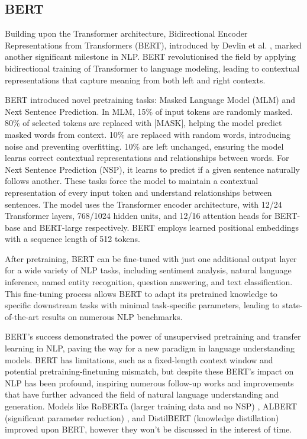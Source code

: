 \documentclass[a4paper, oneside]{discothesis}
\begin{document}
\subsection{BERT}
Building upon the Transformer architecture, Bidirectional Encoder Representations from Transformers (BERT), introduced by Devlin et al. \cite{devlin2018bert}, marked another significant milestone in NLP. BERT revolutionised the field by applying bidirectional training of Transformer to language modeling, leading to contextual representations that capture meaning from both left and right contexts.

BERT introduced novel pretraining tasks: Masked Language Model (MLM) and Next Sentence Prediction. In MLM, 15\% of input tokens are randomly masked. 80\% of selected tokens are replaced with [MASK], helping the model predict masked words from context. 10\% are replaced with random words, introducing noise and preventing overfitting. 10\% are left unchanged, ensuring the model learns correct contextual representations and relationships between words. For Next Sentence Prediction (NSP), it learns to predict if a given sentence naturally follows another. These tasks force the model to maintain a contextual representation of every input token and understand relationships between sentences.
The model uses the Transformer encoder architecture, with 12/24 Transformer layers, 768/1024 hidden units, and 12/16 attention heads for BERT-base and BERT-large respectively. BERT employs learned positional embeddings with a sequence length of 512 tokens.

After pretraining, BERT can be fine-tuned with just one additional output layer for a wide variety of NLP tasks, including sentiment analysis, natural language inference, named entity recognition, question answering, and text classification. 
This fine-tuning process allows BERT to adapt its pretrained knowledge to specific downstream tasks with minimal task-specific parameters, leading to state-of-the-art results on numerous NLP benchmarks.

BERT's success demonstrated the power of unsupervised pretraining and transfer learning in NLP, paving the way for a new paradigm in language understanding models. BERT has limitations, such as a fixed-length context window and potential pretraining-finetuning mismatch, but despite these BERT's impact on NLP has been profound, inspiring numerous follow-up works and improvements that have further advanced the field of natural language understanding and generation. Models like RoBERTa (larger training data and no NSP) \cite{liu2019roberta}, ALBERT (significant parameter reduction) \cite{lan2020albert}, and DistilBERT (knowledge distillation) \cite{sanh2020distilbert} improved upon BERT, however they won't be discussed in the interest of time. 
\end{document}
